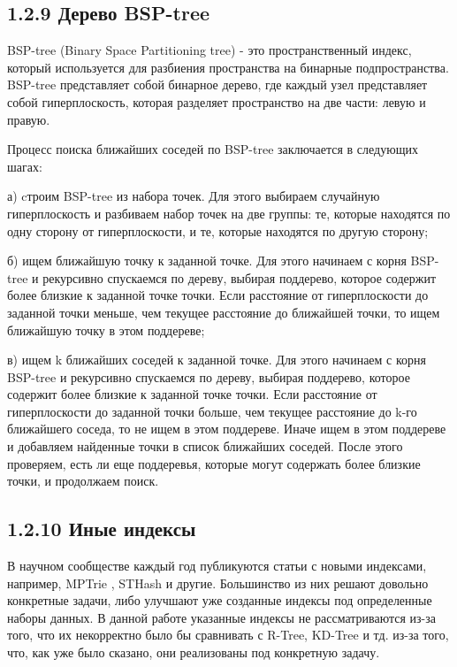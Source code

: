 \subsection{1.2.9 Дерево BSP-tree}
BSP-tree (Binary Space Partitioning tree) - это пространственный индекс, который используется для разбиения пространства на бинарные подпространства\cite{liuGBTree}. BSP-tree представляет собой бинарное дерево, где каждый узел представляет собой гиперплоскость, которая разделяет пространство на две части: левую и правую.

Процесс поиска ближайших соседей по BSP-tree заключается в следующих шагах:
\par а) cтроим BSP-tree из набора точек. Для этого выбираем случайную гиперплоскость и разбиваем набор точек на две группы: те, которые находятся по одну сторону от гиперплоскости, и те, которые находятся по другую сторону;
\par б) ищем ближайшую точку к заданной точке. Для этого начинаем с корня BSP-tree и рекурсивно спускаемся по дереву, выбирая поддерево, которое содержит более близкие к заданной точке точки. Если расстояние от гиперплоскости до заданной точки меньше, чем текущее расстояние до ближайшей точки, то ищем ближайшую точку в этом поддереве;
\par в) ищем k ближайших соседей к заданной точке. Для этого начинаем с корня BSP-tree и рекурсивно спускаемся по дереву, выбирая поддерево, которое содержит более близкие к заданной точке точки. Если расстояние от гиперплоскости до заданной точки больше, чем текущее расстояние до k-го ближайшего соседа, то не ищем в этом поддереве. Иначе ищем в этом поддереве и добавляем найденные точки в список ближайших соседей. После этого проверяем, есть ли еще поддеревья, которые могут содержать более близкие точки, и продолжаем поиск.

\subsection{1.2.10 Иные индексы}
В научном сообществе каждый год публикуются статьи с новыми индексами, например, MPTrie \cite{gantiMPTrie}, STHash\cite{guanSTHash} и другие. Большинство из них решают довольно конкретные задачи, либо улучшают уже созданные индексы под определенные наборы данных. В данной работе указанные индексы не рассматриваются из-за того, что их некорректно было бы сравнивать с R-Tree, KD-Tree и тд. из-за того, что, как уже было сказано, они реализованы под конкретную задачу. 